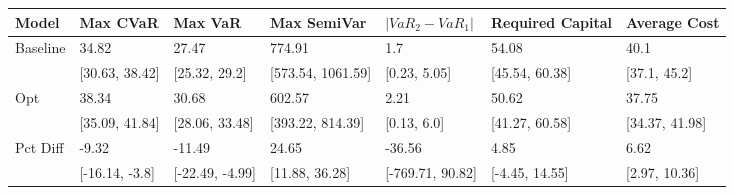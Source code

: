 \begin{tabular}{lllllll}
\toprule
   Model &       Max CVaR &         Max VaR &       Max SemiVar & $|VaR_2 - VaR_1|$ & Required Capital &   Average Cost \\
\midrule
Baseline &          34.82 &           27.47 &            774.91 &               1.7 &            54.08 &           40.1 \\
         & [30.63, 38.42] &   [25.32, 29.2] & [573.54, 1061.59] &      [0.23, 5.05] &   [45.54, 60.38] &   [37.1, 45.2] \\
     Opt &          38.34 &           30.68 &            602.57 &              2.21 &            50.62 &          37.75 \\
         & [35.09, 41.84] &  [28.06, 33.48] &  [393.22, 814.39] &       [0.13, 6.0] &   [41.27, 60.58] & [34.37, 41.98] \\
Pct Diff &          -9.32 &          -11.49 &             24.65 &            -36.56 &             4.85 &           6.62 \\
         & [-16.14, -3.8] & [-22.49, -4.99] &    [11.88, 36.28] &  [-769.71, 90.82] &   [-4.45, 14.55] &  [2.97, 10.36] \\
\bottomrule
\end{tabular}
